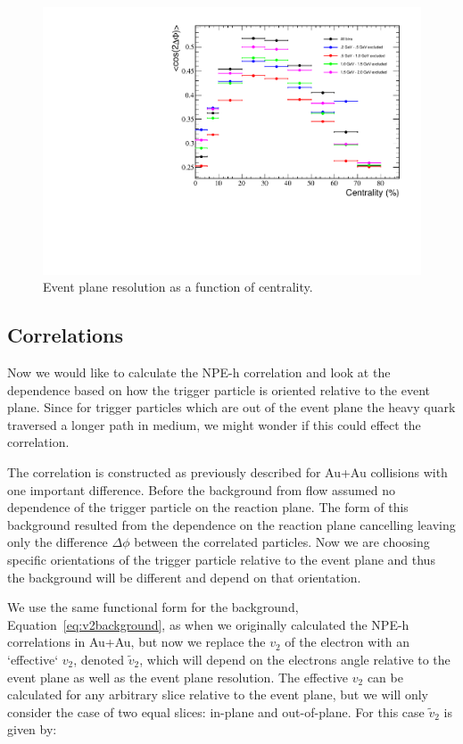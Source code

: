 \begin{figure}[htbp]
\begin{center}
\includegraphics[scale=.75]{Plots/Correlations/EPRes_MRP.pdf}
\end{center}
\caption[Event Plane Resolutions]{Event plane resolution as a function of centrality.}
\label{fig:EPRes_MRP}
\end{figure}

\subsection{Correlations}

Now we would like to calculate the NPE-h correlation and look at the dependence based on how the trigger particle is oriented relative to the event plane. Since for trigger particles which are out of the event plane the heavy quark traversed a longer path in medium, we might wonder if this could effect the correlation.

The correlation is constructed as previously described for Au+Au collisions with one important difference. Before the background from flow assumed no dependence of the trigger particle on the reaction plane. The form of this background resulted from the dependence on the reaction plane cancelling leaving only the difference $\Delta\phi$ between the correlated particles. Now we are choosing specific orientations of the trigger particle relative to the event plane and thus the background will be different and depend on that orientation.

We use the same functional form for the background, Equation~\ref{eq:v2background}, as when we originally calculated the NPE-h correlations in Au+Au, but now we replace the $v_2$ of the electron with an `effective` $v_2$, denoted $\widetilde{v}_{2}$, which will depend on the electrons angle relative to the event plane as well as the event plane resolution. The effective $v_2$ can be calculated for any arbitrary slice relative to the event plane, but we will only consider the case of two equal slices: in-plane and out-of-plane. For this case $\widetilde{v}_{2}$ is given by:

